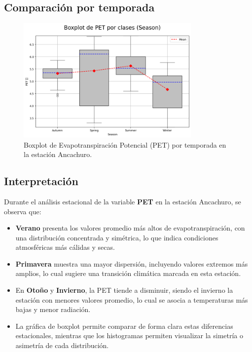 \subsection{Comparación por temporada}

\begin{figure}[H]
\centering
\includegraphics[width=0.8\textwidth]{resultados/por_estacion_del_anio/Ancachuro/PET_ClassBoxplot_Season.png}
\caption{Boxplot de Evapotranspiración Potencial (PET) por temporada en la estación Ancachuro.}
\label{fig:pet_box_ancachuro}
\end{figure}

\subsection*{Interpretación}

Durante el análisis estacional de la variable \textbf{PET} en la estación Ancachuro, se observa que:

\begin{itemize}
    \item \textbf{Verano} presenta los valores promedio más altos de evapotranspiración, con una distribución concentrada y simétrica, lo que indica condiciones atmosféricas más cálidas y secas.
    \item \textbf{Primavera} muestra una mayor dispersión, incluyendo valores extremos más amplios, lo cual sugiere una transición climática marcada en esta estación.
    \item En \textbf{Otoño} y \textbf{Invierno}, la PET tiende a disminuir, siendo el invierno la estación con menores valores promedio, lo cual se asocia a temperaturas más bajas y menor radiación.
    \item La gráfica de boxplot permite comparar de forma clara estas diferencias estacionales, mientras que los histogramas permiten visualizar la simetría o asimetría de cada distribución.
\end{itemize}
